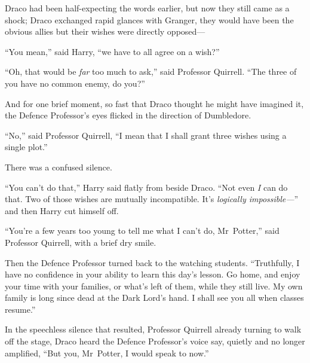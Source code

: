 Draco had been half-expecting the words earlier, but now they still came as a shock; Draco exchanged rapid glances with Granger, they would have been the obvious allies but their wishes were directly opposed—

“You mean,” said Harry, “we have to all agree on a wish?”

“Oh, that would be \emph{far} too much to ask,” said Professor Quirrell. “The three of you have no common enemy, do you?”

And for one brief moment, so fast that Draco thought he might have imagined it, the Defence Professor’s eyes flicked in the direction of Dumbledore.

“No,” said Professor Quirrell, “I mean that I shall grant three wishes using a single plot.”

There was a confused silence.

“You can’t do that,” Harry said flatly from beside Draco. “Not even \emph{I} can do that. Two of those wishes are mutually incompatible. It’s \emph{logically impossible—}” and then Harry cut himself off.

“You’re a few years too young to tell me what I can’t do, Mr~Potter,” said Professor Quirrell, with a brief dry smile.

Then the Defence Professor turned back to the watching students. “Truthfully, I have no confidence in your ability to learn this day’s lesson. Go home, and enjoy your time with your families, or what’s left of them, while they still live. My own family is long since dead at the Dark Lord’s hand. I shall see you all when classes resume.”

In the speechless silence that resulted, Professor Quirrell already turning to walk off the stage, Draco heard the Defence Professor’s voice say, quietly and no longer amplified, “But you, Mr~Potter, I would speak to now.”

